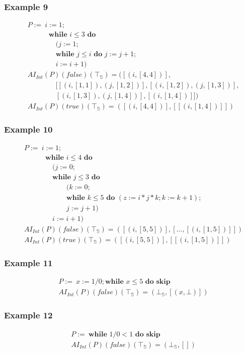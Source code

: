 \documentclass{beamer}
\begin{document}
\begin{frame}
    \frametitle{Example 9}
    \begin{align*}
        &P :=\ i := 1;\\
        & \qquad \quad     \textbf {while } i \le 3 \textbf { do } \\
        & \qquad \qquad (j := 1; \\
        & \qquad \qquad \textbf {while } j \le i \textbf { do } j := j + 1; \\
        & \qquad \qquad i := i + 1) \\
        &AI_{Int} (P) (false) (\top_\mathbb{S}) = ([(i, [4, 4])], \\ 
        & \qquad \qquad [[(i, [1, 1]), (j, [1, 2])], [(i, [1, 2]), (j, [1, 3])], \\ 
        & \qquad \qquad [(i, [1, 3]), (j, [1, 4])], [(i, [1, 4])]]) \\
        &AI_{Int} (P) (true) (\top_\mathbb{S}) = ([(i, [4, 4])], [[(i, [1, 4])]])
    \end{align*}
\end{frame}

\begin{frame}
    \frametitle{Example 10}
    \begin{align*}
        &P :=\ i := 1;\\
        & \qquad \quad     \textbf {while } i \le 4 \textbf { do } \\
        & \qquad \qquad (j := 0; \\
        & \qquad \qquad \textbf {while } j \le 3 \textbf { do } \\
        & \qquad \qquad \qquad (k := 0; \\
        & \qquad \qquad \qquad\textbf {while } k \le 5 \textbf { do } (z := i * j * k; k := k + 1); \\
        & \qquad \qquad \qquad j := j + 1) \\
        & \qquad \qquad i := i + 1) \\
        &AI_{Int} (P) (false) (\top_\mathbb{S}) = ([(i, [5, 5])], [..., [(i, [1, 5])]]) \\
        &AI_{Int} (P) (true) (\top_\mathbb{S}) = ([(i, [5, 5])], [[(i, [1, 5])]])
    \end{align*}
\end{frame}

\begin{frame}
    \frametitle{Example 11}
    \begin{align*}
        &P :=\  x := 1 / 0; \textbf {while } x \le 5 \textbf { do skip}\\
        &AI_{Int} (P) (false) (\top_\mathbb{S}) = (\bot_\mathbb{S}, [(x, \bot)])
    \end{align*}
\end{frame}

\begin{frame}
    \frametitle{Example 12}
    \begin{align*}
        &P :=\ \textbf {while } 1 / 0 < 1 \textbf { do skip}\\
        &AI_{Int} (P) (false) (\top_\mathbb{S}) = (\bot_\mathbb{S}, [])
    \end{align*}
\end{frame}
\end{document}

